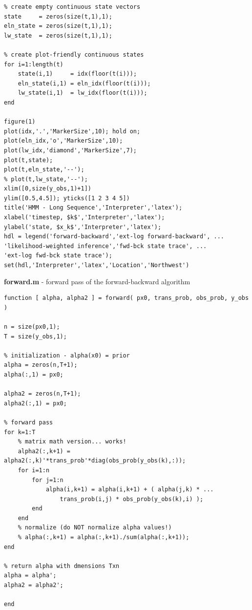 \documentclass[]{article}
\begin{document}
\begin{lstlisting}
% create empty continuous state vectors
state     = zeros(size(t,1),1);
eln_state = zeros(size(t,1),1);
lw_state  = zeros(size(t,1),1);

% create plot-friendly continuous states
for i=1:length(t)
	state(i,1)     = idx(floor(t(i)));
	eln_state(i,1) = eln_idx(floor(t(i)));
	lw_state(i,1)  = lw_idx(floor(t(i)));
end

figure(1)
plot(idx,'.','MarkerSize',10); hold on;
plot(eln_idx,'o','MarkerSize',10);
plot(lw_idx,'diamond','MarkerSize',7);
plot(t,state);
plot(t,eln_state,'--');
% plot(t,lw_state,'--');
xlim([0,size(y_obs,1)+1])
ylim([0.5,4.5]); yticks([1 2 3 4 5])
title('HMM - Long Sequence','Interpreter','latex');
xlabel('timestep, $k$','Interpreter','latex');
ylabel('state, $x_k$','Interpreter','latex');
hdl = legend('forward-backward','ext-log forward-backward', ...
'likelihood-weighted inference','fwd-bck state trace', ...
'ext-log fwd-bck state trace');
set(hdl,'Interpreter','latex','Location','Northwest')
\end{lstlisting}

\textbf{forward.m} - forward pass of the forward-backward algorithm
\begin{lstlisting}
function [ alpha, alpha2 ] = forward( px0, trans_prob, obs_prob, y_obs )

n = size(px0,1);
T = size(y_obs,1);

% initialization - alpha(x0) = prior
alpha = zeros(n,T+1);
alpha(:,1) = px0;

alpha2 = zeros(n,T+1);
alpha2(:,1) = px0;

% forward pass
for k=1:T
	% matrix math version... works!
	alpha2(:,k+1) = alpha2(:,k)'*trans_prob'*diag(obs_prob(y_obs(k),:));
	for i=1:n
		for j=1:n
			alpha(i,k+1) = alpha(i,k+1) + ( alpha(j,k) * ...
				trans_prob(i,j) * obs_prob(y_obs(k),i) );
		end
	end
	% normalize (do NOT normalize alpha values!)
	% alpha(:,k+1) = alpha(:,k+1)./sum(alpha(:,k+1));
end

% return alpha with dmensions Txn
alpha = alpha';
alpha2 = alpha2';

end
\end{lstlisting}
\end{document}

